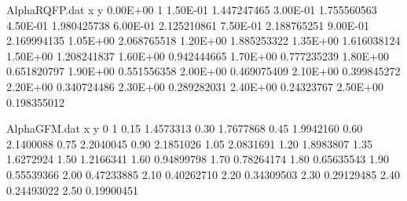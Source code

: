 \begin{filecontents}{AlphaRQFP.dat}
x y
0.00E+00 1
1.50E-01 1.447247465
3.00E-01 1.755560563
4.50E-01 1.980425738
6.00E-01 2.125210861
7.50E-01 2.188765251
9.00E-01 2.169994135
1.05E+00 2.068765518
1.20E+00 1.885253322
1.35E+00 1.616038124
1.50E+00 1.208241837
1.60E+00 0.942444665
1.70E+00 0.777235239
1.80E+00 0.651820797
1.90E+00 0.551556358
2.00E+00 0.469075409
2.10E+00 0.399845272
2.20E+00 0.340724486
2.30E+00 0.289282031
2.40E+00 0.24323767
2.50E+00 0.198355012
\end{filecontents}

\begin{filecontents}{AlphaGFM.dat}
x    y
0    1
0.15 1.4573313
0.30 1.7677868
0.45 1.9942160
0.60 2.1400088
0.75 2.2040045
0.90 2.1851026
1.05 2.0831691
1.20 1.8983807
1.35 1.6272924
1.50 1.2166341
1.60 0.94899798
1.70 0.78264174
1.80 0.65635543
1.90 0.55539366
2.00 0.47233885
2.10 0.40262710
2.20 0.34309503
2.30 0.29129485
2.40 0.24493022
2.50 0.19900451
\end{filecontents}

